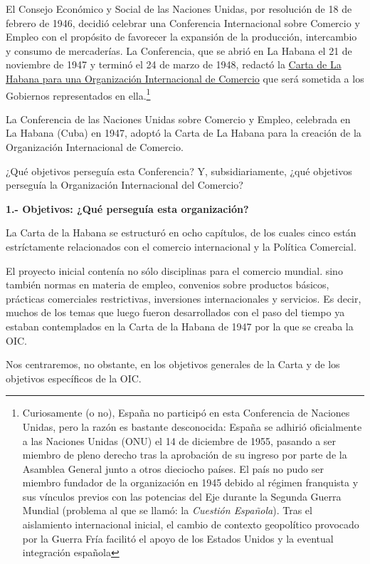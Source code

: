 \documentclass[10pt,a4paper]{article}
\begin{document}
El Consejo Económico y Social de las Naciones Unidas, por resolución de 18 de febrero de 1946, decidió celebrar una Conferencia Internacional sobre Comercio y Empleo con el propósito de favorecer la expansión de la producción, intercambio y consumo de mercaderías. La Conferencia, que se abrió en La Habana el 21 de noviembre de 1947 y terminó el 24 de marzo de 1948, redactó la \href{https://www.wto.org/spanish/docs_s/legal_s/havana_s.pdf}{Carta de La Habana para una Organización Internacional de Comercio} que será sometida a los Gobiernos representados en ella.\footnote{%
    Curiosamente (o no), España no participó en esta Conferencia de Naciones Unidas, pero la razón es bastante desconocida: España se adhirió oficialmente a las Naciones Unidas (ONU) el 14 de diciembre de 1955, pasando a ser miembro de pleno derecho tras la aprobación de su ingreso por parte de la Asamblea General junto a otros dieciocho países. El país no pudo ser miembro fundador de la organización en 1945 debido al régimen franquista y sus vínculos previos con las potencias del Eje durante la Segunda Guerra Mundial (problema al que se llamó: la \textit{Cuestión Española}). Tras el aislamiento internacional inicial, el cambio de contexto geopolítico provocado por la Guerra Fría facilitó el apoyo de los Estados Unidos y la eventual integración española
}

La Conferencia de las Naciones Unidas sobre Comercio y Empleo, celebrada en La Habana (Cuba) en 1947, adoptó la Carta de La Habana para la creación de la Organización Internacional de Comercio.

¿Qué objetivos perseguía esta Conferencia? Y, subsidiariamente, ¿qué objetivos perseguía la Organización Internacional del Comercio?

\textbf{1.- Objetivos: ¿Qué perseguía esta organización?}

La Carta de la Habana se estructuró en ocho capítulos, de los cuales cinco están estríctamente relacionados con el comercio internacional y la Política Comercial. 

El proyecto inicial contenía no sólo disciplinas para el comercio mundial. sino también normas en materia de empleo, convenios sobre productos básicos, prácticas comerciales restrictivas, inversiones internacionales y servicios. Es decir, muchos de los temas que luego fueron desarrollados con el paso del tiempo ya estaban contemplados en la Carta de la Habana de 1947 por la que se creaba la OIC.

Nos centraremos, no obstante, en los objetivos generales de la Carta y de los objetivos específicos de la OIC.
\end{document}
